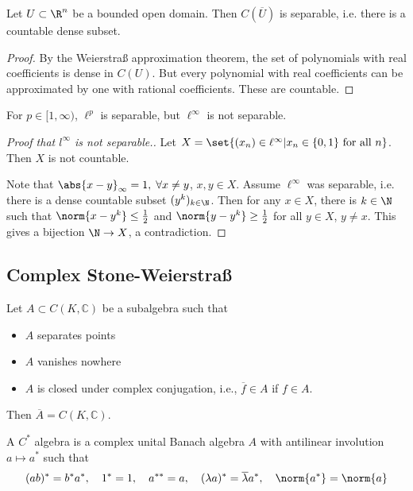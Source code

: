 \documentclass{article}
\begin{document}
\begin{cor}
    Let $U \subset \R^n$ be a bounded open domain. Then $C(\overline{U})$ is separable, i.e. there is a countable dense subset.
\end{cor}

\begin{proof}
    By the Weierstra{\ss} approximation theorem, the set of polynomials with real coefficients is dense in $C(U)$.
    But every polynomial with real coefficients can be approximated by one with rational coefficients.
    These are countable.
\end{proof}

\begin{remark}
    For $p \in [1, \infty)$, $\ell^p$ is separable, but $\ell^\infty$ is not separable.
\end{remark}

\begin{proof}[Proof that $l^\infty$ is not separable.]
    Let $X = \set{(x_n) \in \ell^\infty | x_n \in \{0, 1\} \text{ for all } n}$.
    Then $X$ is not countable.

    Note that $\abs{x - y}_\infty = 1, \; \forall x \neq y$, $x, y \in X$.
    Assume $\ell^\infty$ was separable, i.e. there is a dense countable subset $(y^k)_{k \in \N}$.
    Then for any $x \in X$, there is $k \in \N$ such that $\norm{x - y^k} \leq \frac{1}{2}$ and $\norm{y - y^k} \geq \frac{1}{2}$ for all $y \in X$, $y \neq x$.
    This gives a bijection $\N \to X$, a contradiction. %
\end{proof}


\subsection{Complex Stone-Weierstra{\ss}}
\begin{thm}
    Let $A \subset C(K, \mathbb{C})$ be a subalgebra such that
    \begin{itemize}
        \item $A$ separates points
        \item $A$ vanishes nowhere
        \item $A$ is closed under complex conjugation, i.e., $\overline{f} \in A$ if $f \in A$.
    \end{itemize}
    Then $\overline{A} = C(K, \mathbb{C})$.
\end{thm}

\begin{defi}[$C^*$-algebra]
    A $C^*$ algebra is a complex unital Banach algebra $A$ with antilinear involution $a \mapsto a^*$ such that
    \begin{align*}
        (ab)^* = b^* a^*, \quad 1^* = 1, \quad a^{**} = a, \quad (\lambda a)^* = \overline{\lambda} a^*, \quad \norm{a^*} = \norm{a}
    \end{align*}
\end{defi}
\end{document}
